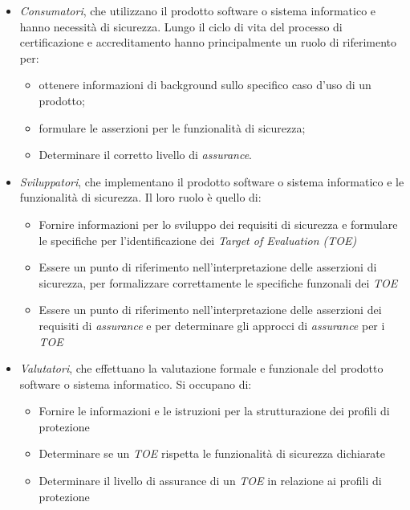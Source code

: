 \documentclass[../main.tex]{subfiles}
\begin{document}
\begin{itemize}
\item \textit{Consumatori}, che utilizzano il prodotto software o sistema informatico e hanno necessità di sicurezza. Lungo il ciclo di vita del processo di certificazione e accreditamento hanno principalmente un ruolo di riferimento per:
\begin{itemize}
\item ottenere informazioni di background sullo specifico caso d'uso di un prodotto;
\item formulare le asserzioni per le funzionalità di sicurezza;
\item Determinare il corretto livello di \textit{assurance}.
\end{itemize}
\item \textit{Sviluppatori}, che implementano il prodotto software o sistema informatico e le funzionalità di sicurezza. Il loro ruolo è quello di:
\begin{itemize}
\item Fornire informazioni per lo sviluppo dei requisiti di sicurezza e formulare le specifiche per l'identificazione dei \textit{Target of Evaluation (TOE)}
\item Essere un punto di riferimento nell'interpretazione delle asserzioni di sicurezza, per formalizzare correttamente le specifiche funzonali dei \textit{TOE}
\item Essere un punto di riferimento nell'interpretazione delle asserzioni dei requisiti di \textit{assurance} e per determinare gli approcci di \textit{assurance} per i \textit{TOE}
\end{itemize}
\item \textit{Valutatori}, che effettuano la valutazione formale e funzionale del prodotto software o sistema informatico. Si occupano di:
\begin{itemize}
\item Fornire le informazioni e le istruzioni per la strutturazione dei profili di protezione
\item Determinare se un \textit{TOE} rispetta le funzionalità di sicurezza dichiarate
\item Determinare il livello di assurance di un \textit{TOE} in relazione ai profili di protezione
\end{itemize}
\end{itemize}
\end{document}
